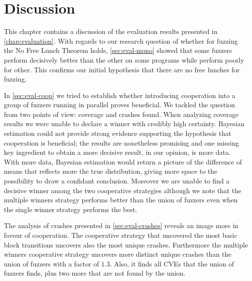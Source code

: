 \chapter{Discussion}
\label{chap:discussion}

This chapter contains a discussion of the evaluation results presented in
\autoref{chap:evaluation}. With regards to our research question of whether for
fuzzing the No Free Lunch Theorem holds, \autoref{sec:eval-mono} showed that
some fuzzers perform decisively better than the other on some programs while
perform poorly for other. This confirms our initial hypothesis that there are no
free lunches for fuzzing.

In \autoref{sec:eval-coop} we tried to establish whether introducing cooperation
into a group of fuzzers running in parallel proves beneficial. We tackled the
question from two points of view: coverage and crashes found. When analyzing
coverage results we were unable to declare a winner with credibly high
certainty. Bayesian estimation could not provide strong evidence supporting the
hypothesis that cooperation is beneficial; the results are nonetheless promising
and one missing key ingredient to obtain a more decisive result, in our opinion,
is more data. With more data, Bayesian estimation would return a picture of the
difference of means that reflects more the true distribution, giving more space
to the possibility to draw a confidant conclusion. Moreover we are unable to
find a decisive winner among the two cooperative strategies although we note
that the multiple winners strategy performs better than the union of fuzzers
even when the single winner strategy performs the best.

The analysis of crashes presented in \autoref{sec:eval-crashes} reveals an image
more in favour of cooperation. The cooperative strategy that uncovered the most
basic block transitions uncovers also the most unique crashes. Furthermore the
multiple winners cooperative strategy uncovers more distinct unique crashes than
the union of fuzzers with a factor of $1.3$. Also, it finds all \acp{CVE} that
the union of fuzzers finds, plus two more that are not found by the union.

